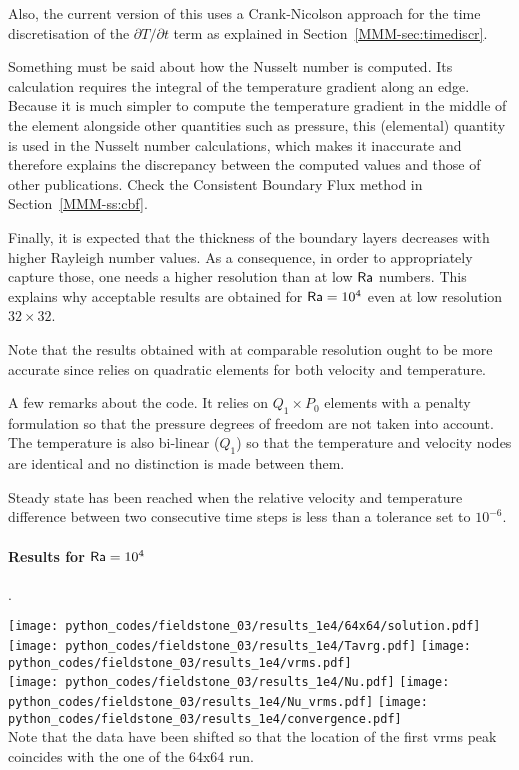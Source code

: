 Also, the current version of this \stone uses a Crank-Nicolson approach for the 
time discretisation of the $\partial T/\partial t$ term as explained in Section~\ref{MMM-sec:timediscr}.

Something must be said about how the Nusselt number is computed. 
Its calculation requires the integral of the temperature gradient along an edge. 
Because it is much simpler to compute the temperature gradient in the middle of the 
element alongside other quantities such as pressure, this (elemental) quantity is 
used in the Nusselt number calculations, which makes it inaccurate and therefore 
explains the discrepancy between the computed values and those of other publications.
Check the Consistent Boundary Flux method in Section~\ref{MMM-ss:cbf}.

Finally, it is expected that the thickness of the 
boundary layers decreases with higher Rayleigh number values.
As a consequence, in order to appropriately capture those, one needs 
a higher resolution than at low ${\mathsf{Ra}}$ numbers. This explains why 
acceptable results are obtained for ${\mathsf{Ra}}=10^4$  even at low resolution $32\times 32$.

Note that the results obtained with \aspect at comparable resolution ought to be 
more accurate since \aspect relies on quadratic elements for both velocity and 
temperature. 

A few remarks about the code. It relies on $Q_1\times P_0$ elements with a penalty
formulation so that the pressure degrees of freedom are not taken into account. 
The temperature is also bi-linear ($Q_1$) so that the temperature and velocity nodes 
are identical and no distinction is made between them.

Steady state has been reached when the relative velocity and temperature difference between two consecutive 
time steps is less than a tolerance set to $10^{-6}$. 


\newpage
\paragraph{Results for ${\mathsf{Ra}}=10^4$}.
\begin{center}
\texttt{[image: python\_codes/fieldstone\_03/results\_1e4/64x64/solution.pdf]}\\
\texttt{[image: python\_codes/fieldstone\_03/results\_1e4/Tavrg.pdf]}
\texttt{[image: python\_codes/fieldstone\_03/results\_1e4/vrms.pdf]}\\
\texttt{[image: python\_codes/fieldstone\_03/results\_1e4/Nu.pdf]}
\texttt{[image: python\_codes/fieldstone\_03/results\_1e4/Nu\_vrms.pdf]}
\texttt{[image: python\_codes/fieldstone\_03/results\_1e4/convergence.pdf]}\\
{\captionfont Note that the \aspect data have been shifted so that the location of the 
first vrms peak coincides with the one of the 64x64 run.}
\end{center}

